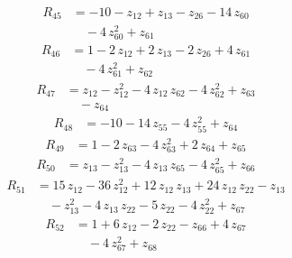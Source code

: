 \begin{equation*}\begin{aligned}
R_{45}&=-10 -z_{12} +z_{13} -z_{26} -14\,z_{60} \\
&\quad -4\,z_{60}^{2} +z_{61}
\end{aligned}\end{equation*}
\begin{equation*}\begin{aligned}
R_{46}&=1 -2\,z_{12} +2\,z_{13} -2\,z_{26} +4\,z_{61} \\
&\quad -4\,z_{61}^{2} +z_{62}
\end{aligned}\end{equation*}
\begin{equation*}\begin{aligned}
R_{47}&=z_{12} -z_{12}^{2} -4\,z_{12}\,z_{62} -4\,z_{62}^{2} +z_{63} \\
&\quad -z_{64}
\end{aligned}\end{equation*}
\begin{equation*}\begin{aligned}
R_{48}&=-10 -14\,z_{55} -4\,z_{55}^{2} +z_{64}
\end{aligned}\end{equation*}
\begin{equation*}\begin{aligned}
R_{49}&=1 -2\,z_{63} -4\,z_{63}^{2} +2\,z_{64} +z_{65}
\end{aligned}\end{equation*}
\begin{equation*}\begin{aligned}
R_{50}&=z_{13} -z_{13}^{2} -4\,z_{13}\,z_{65} -4\,z_{65}^{2} +z_{66}
\end{aligned}\end{equation*}
\begin{equation*}\begin{aligned}
R_{51}&=15\,z_{12} -36\,z_{12}^{2} +12\,z_{12}\,z_{13} +24\,z_{12}\,z_{22} -z_{13} \\
&\quad -z_{13}^{2} -4\,z_{13}\,z_{22} -5\,z_{22} -4\,z_{22}^{2} +z_{67}
\end{aligned}\end{equation*}
\begin{equation*}\begin{aligned}
R_{52}&=1 +6\,z_{12} -2\,z_{22} -z_{66} +4\,z_{67} \\
&\quad -4\,z_{67}^{2} +z_{68}
\end{aligned}\end{equation*}
